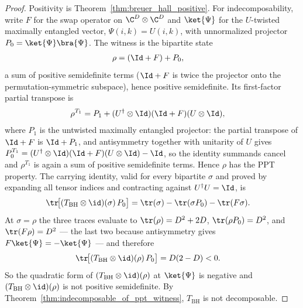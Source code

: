 \begin{proof}
    \leanok
    Positivity is Theorem~\ref{thm:breuer_hall_positive}. For
    indecomposability, write $F$ for the swap operator on
    $\C^{D}\otimes\C^{D}$ and $\ket{\Psi}$ for the $U$-twisted maximally
    entangled vector, $\Psi(i,k)=U(i,k)$, with unnormalized projector
    $P_{0}=\ket{\Psi}\bra{\Psi}$. The witness is the bipartite state
    \begin{align}
        \rho & =(\Id+F)+P_{0},
        \notag
    \end{align}
    a sum of positive semidefinite terms ($\Id+F$ is twice the projector onto
    the permutation-symmetric subspace), hence positive semidefinite. Its
    first-factor partial transpose is
    \begin{align}
        \rho^{T_{1}} & =P_{1}+(U^{\dagger}\otimes\Id)(\Id+F)(U\otimes\Id),
        \notag
    \end{align}
    where $P_{1}$ is the untwisted maximally entangled projector: the partial
    transpose of $\Id+F$ is $\Id+P_{1}$, and antisymmetry together with
    unitarity of $U$ gives
    $P_{0}^{T_{1}}=(U^{\dagger}\otimes\Id)(\Id+F)(U\otimes\Id)-\Id$, so the
    identity summands cancel and $\rho^{T_{1}}$ is again a sum of positive
    semidefinite terms. Hence $\rho$ has the PPT property. The carrying
    identity, valid for every bipartite $\sigma$ and proved by expanding all
    tensor indices and contracting against $U^{\dagger}U=\Id$, is
    \begin{align}
        \tr\!\big[(T_{\mathrm{BH}}\otimes\id)(\sigma)\,P_{0}\big]
         & =\tr(\sigma)-\tr(\sigma P_{0})-\tr(F\sigma).
        \notag
    \end{align}
    At $\sigma=\rho$ the three traces evaluate to $\tr(\rho)=D^{2}+2D$,
    $\tr(\rho P_{0})=D^{2}$, and $\tr(F\rho)=D^{2}$ --- the last two because
    antisymmetry gives $F\ket{\Psi}=-\ket{\Psi}$ --- and therefore
    \begin{align}
        \tr\!\big[(T_{\mathrm{BH}}\otimes\id)(\rho)\,P_{0}\big]
         & =D(2-D)<0.
        \notag
    \end{align}
    So the quadratic form of $(T_{\mathrm{BH}}\otimes\id)(\rho)$ at
    $\ket{\Psi}$ is negative and $(T_{\mathrm{BH}}\otimes\id)(\rho)$ is not
    positive semidefinite. By
    Theorem~\ref{thm:indecomposable_of_ppt_witness}, $T_{\mathrm{BH}}$ is not
    decomposable.
\end{proof}
